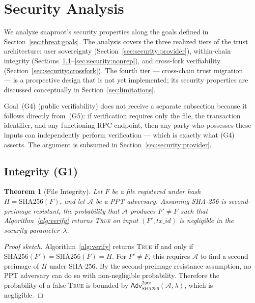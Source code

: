 \documentclass[11pt,a4paper]{article}
\newtheorem{theorem}{Theorem}[section]
\begin{document}
\section{Security Analysis}
\label{sec:security}

We analyze snaproot's security properties along the goals defined in
Section~\ref{sec:threat:goals}. The analysis covers the three realized
tiers of the trust architecture: user sovereignty
(Section~\ref{sec:security:provider}), within-chain integrity
(Sections~\ref{sec:security:integrity}--\ref{sec:security:nonrep}), and
cross-fork verifiability (Section~\ref{sec:security:crossfork}). The
fourth tier --- cross-chain trust migration --- is a prospective design
that is not yet implemented; its security properties are discussed
conceptually in Section~\ref{sec:limitations}.

Goal~(G4) (public verifiability) does not receive a separate subsection
because it follows directly from~(G5): if verification requires only the
file, the transaction identifier, and any functioning RPC endpoint, then
any party who possesses these inputs can independently perform
verification --- which is exactly what (G4) asserts. The argument is
subsumed in Section~\ref{sec:security:provider}.

\subsection{Integrity (G1)}
\label{sec:security:integrity}

\begin{theorem}[File Integrity]
\label{thm:integrity}
Let $F$ be a file registered under hash $H = \mathrm{SHA256}(F)$,
and let $\mathcal{A}$ be a PPT adversary. Assuming SHA-256 is
second-preimage resistant, the probability that $\mathcal{A}$ produces
$F' \neq F$ such that Algorithm~\ref{alg:verify} returns \textsc{True}
on input $(F', \mathit{tx\_id})$ is negligible in the security
parameter~$\lambda$.
\end{theorem}

\begin{proof}[Proof sketch]
Algorithm~\ref{alg:verify} returns \textsc{True} if and only if
$\mathrm{SHA256}(F') = \mathrm{SHA256}(F) = H$. For $F' \neq F$, this
requires $\mathcal{A}$ to find a second preimage of $H$ under SHA-256.
By the second-preimage resistance assumption, no PPT adversary can do
so with non-negligible probability. Therefore the probability of a
false \textsc{True} is bounded by
$\mathsf{Adv}^{\mathrm{2pre}}_{\mathrm{SHA256}}(\mathcal{A}, \lambda)$,
which is negligible.
\end{proof}
\end{document}
